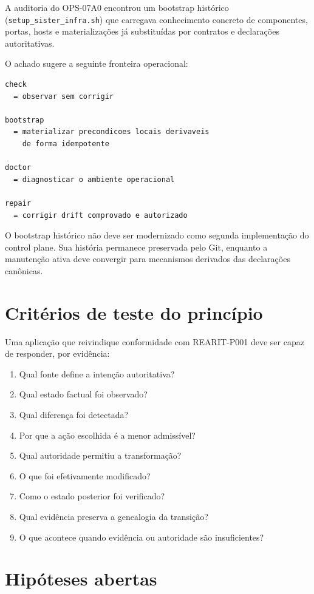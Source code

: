 A auditoria do OPS-07A0 encontrou um bootstrap histórico
(\texttt{setup\_sister\_infra.sh}) que carregava conhecimento concreto de
componentes, portas, hosts e materializações já substituídas por contratos e
declarações autoritativas.

O achado sugere a seguinte fronteira operacional:

\begin{verbatim}
check
  = observar sem corrigir

bootstrap
  = materializar precondicoes locais derivaveis
    de forma idempotente

doctor
  = diagnosticar o ambiente operacional

repair
  = corrigir drift comprovado e autorizado
\end{verbatim}

O bootstrap histórico não deve ser modernizado como segunda implementação do
control plane. Sua história permanece preservada pelo Git, enquanto a
manutenção ativa deve convergir para mecanismos derivados das declarações
canônicas.

\section{Critérios de teste do princípio}

Uma aplicação que reivindique conformidade com REARIT-P001 deve ser capaz de
responder, por evidência:

\begin{enumerate}
  \item Qual fonte define a intenção autoritativa?
  \item Qual estado factual foi observado?
  \item Qual diferença foi detectada?
  \item Por que a ação escolhida é a menor admissível?
  \item Qual autoridade permitiu a transformação?
  \item O que foi efetivamente modificado?
  \item Como o estado posterior foi verificado?
  \item Qual evidência preserva a genealogia da transição?
  \item O que acontece quando evidência ou autoridade são insuficientes?
\end{enumerate}

\section{Hipóteses abertas}

